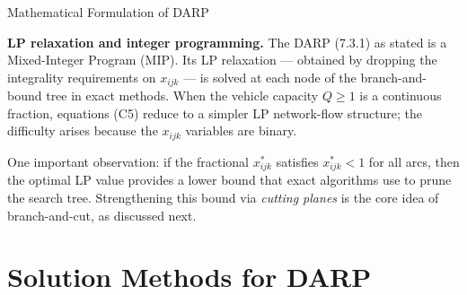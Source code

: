 \documentclass[aspectratio=169,10pt]{beamer}
\begin{document}
\begin{frame}[allowframebreaks]{Mathematical Formulation of DARP}
  \framebreak

  \textbf{LP relaxation and integer programming.}  The DARP (7.3.1) as
  stated is a Mixed-Integer Program (MIP).  Its LP relaxation — obtained by
  dropping the integrality requirements on $x_{ijk}$ — is solved at each
  node of the branch-and-bound tree in exact methods.  When the vehicle
  capacity $Q \geq 1$ is a continuous fraction, equations (C5) reduce to
  a simpler LP network-flow structure; the difficulty arises because the
  $x_{ijk}$ variables are binary.

  One important observation: if the fractional $x_{ijk}^*$ satisfies
  $x_{ijk}^* < 1$ for all arcs, then the optimal LP value provides a lower
  bound that exact algorithms use to prune the search tree.  Strengthening
  this bound via \emph{cutting planes} is the core idea of branch-and-cut,
  as discussed next.

\end{frame}

\section{Solution Methods for DARP}
\end{document}
